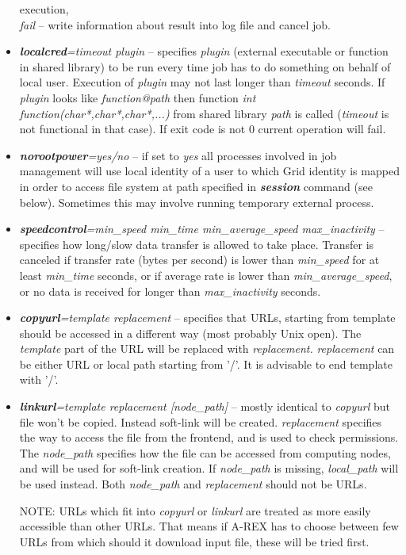 \documentclass{article}                            %
\begin{document}
\begin{itemize}
execution,\\
\textit{fail} -- write information about result into log file and cancel
job.
\item \textbf{\textit{localcred}}\textit{=timeout plugin} -- specifies \emph{plugin}
(external executable or function in shared library) to be run every
time job has to do something on behalf of local user. Execution of
\emph{plugin} may not last longer than \emph{timeout} seconds. If
\emph{plugin} looks like \emph{function@path} then function \emph{int
function(char{*},char{*},char{*},...)} from shared library \emph{path}
is called (\emph{timeout} is not functional in that case). If exit
code is not 0 current operation will fail.
\item \textbf{\textit{norootpower}}\textit{=yes/no} -- if set to \emph{yes}
all processes involved in job management will use local identity of
a user to which Grid identity is mapped in order to access file system
at path specified in \textbf{\textit{session}} command (see below).
Sometimes this may involve running temporary external process.
\item \textbf{\textit{speedcontrol}}\textit{=min\_speed min\_time min\_average\_speed
max\_inactivity} -- specifies how long/slow data transfer is allowed
to take place. Transfer is canceled if transfer rate (bytes per second)
is lower than \emph{min\_speed} for at least \emph{min\_time} seconds,
or if average rate is lower than \emph{min\_average\_speed}, or no
data is received for longer than \textit{max\_inactivity} seconds.
\item \textbf{\textit{copyurl}}\textit{=template replacement} -- specifies
that URLs, starting from template should be accessed in a different
way (most probably Unix open). The \textit{template} part of the URL
will be replaced with \textit{replacement.} \textit{replacement} can
be either URL or local path starting from '/'. It is advisable to
end template with '/'.
\item \textbf{\textit{linkurl}}\textit{=template replacement {[}node\_path]}
-- mostly identical to \textit{copyurl} but file won't be copied. Instead
soft-link will be created. \textit{replacement} specifies the way
to access the file from the frontend, and is used to check permissions.
The \textit{node\_path} specifies how the file can be accessed from
computing nodes, and will be used for soft-link creation. If \textit{node\_path}
is missing, \textit{local\_path} will be used instead. Both \textit{node\_path}
and \textit{replacement} should not be URLs.
\begin{framed}
NOTE: URLs which fit into \textit{copyurl} or \textit{linkurl} are
treated as more easily accessible than other URLs. That means if A-REX
has to choose between few URLs from which should it download input
file, these will be tried first.
\end{framed}
\end{itemize}
\end{document}
